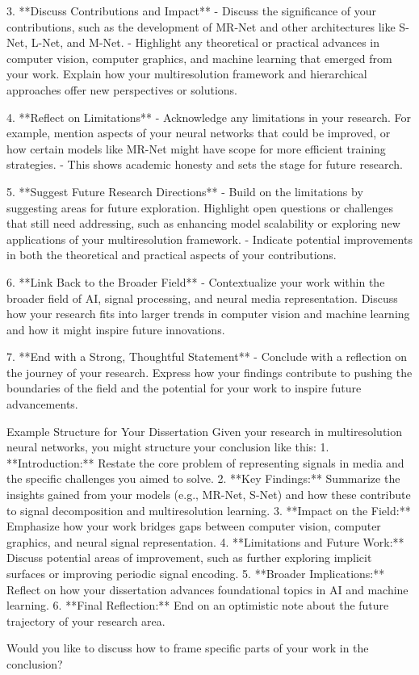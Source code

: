 3. **Discuss Contributions and Impact**
   - Discuss the significance of your contributions, such as the development of MR-Net and other architectures like S-Net, L-Net, and M-Net.
   - Highlight any theoretical or practical advances in computer vision, computer graphics, and machine learning that emerged from your work. Explain how your multiresolution framework and hierarchical approaches offer new perspectives or solutions.

4. **Reflect on Limitations**
   - Acknowledge any limitations in your research. For example, mention aspects of your neural networks that could be improved, or how certain models like MR-Net might have scope for more efficient training strategies.
   - This shows academic honesty and sets the stage for future research.

5. **Suggest Future Research Directions**
   - Build on the limitations by suggesting areas for future exploration. Highlight open questions or challenges that still need addressing, such as enhancing model scalability or exploring new applications of your multiresolution framework.
   - Indicate potential improvements in both the theoretical and practical aspects of your contributions.

6. **Link Back to the Broader Field**
   - Contextualize your work within the broader field of AI, signal processing, and neural media representation. Discuss how your research fits into larger trends in computer vision and machine learning and how it might inspire future innovations.

7. **End with a Strong, Thoughtful Statement**
   - Conclude with a reflection on the journey of your research. Express how your findings contribute to pushing the boundaries of the field and the potential for your work to inspire future advancements.

Example Structure for Your Dissertation
Given your research in multiresolution neural networks, you might structure your conclusion like this:
1. **Introduction:** Restate the core problem of representing signals in media and the specific challenges you aimed to solve.
2. **Key Findings:** Summarize the insights gained from your models (e.g., MR-Net, S-Net) and how these contribute to signal decomposition and multiresolution learning.
3. **Impact on the Field:** Emphasize how your work bridges gaps between computer vision, computer graphics, and neural signal representation.
4. **Limitations and Future Work:** Discuss potential areas of improvement, such as further exploring implicit surfaces or improving periodic signal encoding.
5. **Broader Implications:** Reflect on how your dissertation advances foundational topics in AI and machine learning.
6. **Final Reflection:** End on an optimistic note about the future trajectory of your research area.

Would you like to discuss how to frame specific parts of your work in the conclusion?